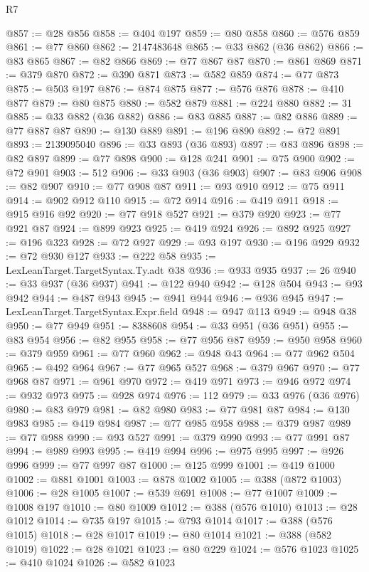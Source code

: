 \begin{lexlean}{R7}
\begin{coremodule}
@857 := @28 @856
@858 := @404 @197
@859 := @80 @858
@860 := @576 @859
@861 := @77 @860
@862 := 2147483648
@865 := @33 @862 (@36 @862)
@866 := @83 @865
@867 := @82 @866
@869 := @77 @867 @87
@870 := @861 @869
@871 := @379 @870
@872 := @390 @871
@873 := @582 @859
@874 := @77 @873
@875 := @503 @197
@876 := @874 @875
@877 := @576 @876
@878 := @410 @877
@879 := @80 @875
@880 := @582 @879
@881 := @224 @880
@882 := 31
@885 := @33 @882 (@36 @882)
@886 := @83 @885
@887 := @82 @886
@889 := @77 @887 @87
@890 := @130 @889
@891 := @196 @890
@892 := @72 @891
@893 := 2139095040
@896 := @33 @893 (@36 @893)
@897 := @83 @896
@898 := @82 @897
@899 := @77 @898
@900 := @128 @241
@901 := @75 @900
@902 := @72 @901
@903 := 512
@906 := @33 @903 (@36 @903)
@907 := @83 @906
@908 := @82 @907
@910 := @77 @908 @87
@911 := @93 @910
@912 := @75 @911
@914 := @902 @912 @110
@915 := @72 @914
@916 := @419 @911
@918 := @915 @916 @92
@920 := @77 @918 @527
@921 := @379 @920
@923 := @77 @921 @87
@924 := @899 @923
@925 := @419 @924
@926 := @892 @925
@927 := @196 @323
@928 := @72 @927
@929 := @93 @197
@930 := @196 @929
@932 := @72 @930 @127
@933 := @222 @58
@935 := LexLeanTarget.TargetSyntax.Ty.adt @38
@936 := @933 @935
@937 := 26
@940 := @33 @937 (@36 @937)
@941 := @122 @940
@942 := @128 @504
@943 := @93 @942
@944 := @487 @943
@945 := @941 @944
@946 := @936 @945
@947 := LexLeanTarget.TargetSyntax.Expr.field
@948 := @947 @113
@949 := @948 @38
@950 := @77 @949
@951 := 8388608
@954 := @33 @951 (@36 @951)
@955 := @83 @954
@956 := @82 @955
@958 := @77 @956 @87
@959 := @950 @958
@960 := @379 @959
@961 := @77 @960
@962 := @948 @43
@964 := @77 @962 @504
@965 := @492 @964
@967 := @77 @965 @527
@968 := @379 @967
@970 := @77 @968 @87
@971 := @961 @970
@972 := @419 @971
@973 := @946 @972
@974 := @932 @973
@975 := @928 @974
@976 := 112
@979 := @33 @976 (@36 @976)
@980 := @83 @979
@981 := @82 @980
@983 := @77 @981 @87
@984 := @130 @983
@985 := @419 @984
@987 := @77 @985 @958
@988 := @379 @987
@989 := @77 @988
@990 := @93 @527
@991 := @379 @990
@993 := @77 @991 @87
@994 := @989 @993
@995 := @419 @994
@996 := @975 @995
@997 := @926 @996
@999 := @77 @997 @87
@1000 := @125 @999
@1001 := @419 @1000
@1002 := @881 @1001
@1003 := @878 @1002
@1005 := @388 (@872 @1003)
@1006 := @28 @1005
@1007 := @539 @691
@1008 := @77 @1007
@1009 := @1008 @197
@1010 := @80 @1009
@1012 := @388 (@576 @1010)
@1013 := @28 @1012
@1014 := @735 @197
@1015 := @793 @1014
@1017 := @388 (@576 @1015)
@1018 := @28 @1017
@1019 := @80 @1014
@1021 := @388 (@582 @1019)
@1022 := @28 @1021
@1023 := @80 @229
@1024 := @576 @1023
@1025 := @410 @1024
@1026 := @582 @1023

\end{coremodule}
\end{lexlean}
